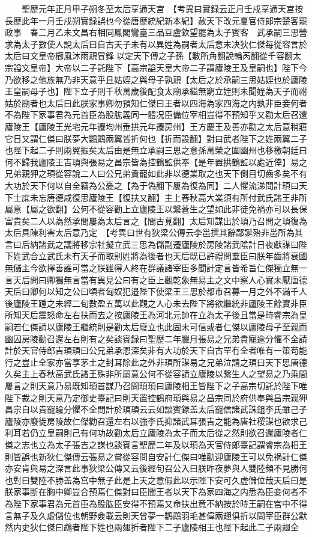 　　聖歷元年正月甲子朔冬至太后享通天宫　【考異曰實録云正月壬戍享通天宫按長歷此年一月壬戍朔實録誤也今從唐歷統紀新本紀】赦天下改元夏官侍郎宗楚客罷政事　春二月乙未文昌右相同鳳閣鸞臺三品豆盧欽望罷為太子賓客　武承嗣三思營求為太子數使人說太后曰自古天子未有以異姓為嗣者太后意未决狄仁傑每從容言於太后曰文皇帝櫛風沐雨親冒鋒以定天下傳之子孫【數所角翻說輪芮翻從千容翻太宗謚文皇帝】大帝以二子託陛下【高宗謚天皇大帝二子謂廬陵王及皇嗣也】陛下今乃欲移之他族無乃非天意乎且姑姪之與母子孰親【太后之於承嗣三思姑姪也於廬陵王皇嗣母子也】陛下立子則千秋萬歲後配食太廟承繼無窮立姪則未聞姪為天子而祔姑於廟者也太后曰此朕家事卿勿預知仁傑曰王者以四海為家四海之内孰非臣妾何者不為陛下家事君為元首臣為股肱義同一體况臣備位宰相豈得不預知乎又勸太后召還廬陵王【廬陵王光宅元年遷均州垂拱元年遷房州】王方慶王及善亦勸之太后意稍寤它日又謂仁傑曰朕夢大鸚鵡兩翼皆折何也【折而設翻】對曰武者陛下之姓兩翼二子也陛下起二子則兩翼振矣太后由是無立承嗣三思之意孫萬榮之圍幽州也移檄朝廷曰何不歸我廬陵王吉頊與張易之昌宗皆為控鶴監供奉【是年置拱鶴監以處近倖】易之兄弟親狎之頊從容說二人曰公兄弟貴寵如此非以德業取之也天下側目切齒多矣不有大功於天下何以自全竊為公憂之【為于偽翻下屢為復為同】二人懼流涕問計頊曰天下士庶未忘唐德咸復思廬陵王【復扶又翻】主上春秋高大業須有所付武氏諸王非所屬意【屬之欲翻】公何不從容勸上立廬陵王以繋蒼生之望如此非徒免禍亦可以長保富貴矣二人以為然承間屢為太后言之【間古莧翻】太后知謀出於頊乃召問之頊復為太后具陳利害太后意乃定　【考異曰世有狄梁公傳云李邕撰其辭鄙誕殆非邕所為其言曰后納諸武之議將移宗社擬立武三思為儲副遷廬陵於房陵諸武隂計日夜獻謀曰陛下姓武合立武氏未冇天子而取别姓將為後者也天后既已許禮問羣臣曰朕年齒將衰國無儲主今欲擇善誰可當之朕雖得人終在群議諸宰臣多聞計定言皆希旨仁傑獨立無一言天后問曰卿獨無言當有異見公曰有之臣上觀乾象無易主之文中察人心實未厭唐德天后曰卿何以知之公曰頃者匈奴犯邉陛下使梁王三思於都市召募一月之外不滿千人後廬陵王踵之未經二旬數盈五萬以此觀之人心未去陛下將欲繼統非廬陵王餘實非臣所知天后震怒命左右扶而去之按廬陵王為河北元帥在立為太子後且當是時睿宗為皇嗣若仁傑請以廬陵王繼統則是勸太后廢立也此固未可信或者仁傑以廬陵母子至親而幽囚房陵勸召還左右則有之矣談賓録曰聖歷二年臘月張易之兄弟貴寵逾分懼不全請計於天官侍郎吉頊頊曰公兄弟承恩深矣非有大功於天下自古罕冇全者唯有一策苟能行之豈止全家亦當享茅土之封耳除此之外非頊所謀易之兄弟泣請之頊曰天下思唐德久矣主上春秋高武氏諸王殊非所屬意公何不從容請立廬陵以繋生人之望易之乃乘間屢言之則天意乃易既知頊首謀乃召問頊頊曰廬陵相王皆陛下之子高宗切託於陛下唯陛下裁之則天意乃定御史臺記曰則天置控鶴府頊與易之昌宗同於府供奉與昌宗親狎昌宗自以貴寵踰分懼不全問計於頊頊云云如談賓録盖太后寵信諸武誅鉏李氏雖己子廬陵亦廢徙房陵故仁傑勸召還左右以強李氏抑諸武耳張吉之能為唐社稷謀也欲求己利耳若仍立皇嗣則己有何功故勸太后立廬陵為太子而太后從之然則欲召還廬陵者仁傑之志也立為太子張吉之謀也談賓言聖歷二年及以頊為天官侍郎臺記謂睿宗為相王則皆誤也新狄仁傑傳云張易之嘗從容問自安計仁傑曰唯勸迎廬陵王可以免祸計仁傑亦安肯與易之深言此事狄梁公傳又云後經旬召公入曰朕昨夜夢與人雙陸頻不見勝何也對曰雙陸不勝盖為宫中無子此是上天之意假此以示陛下安可久虚儲位哉天后曰是朕家事斷在胸中卿豈合預焉仁傑對曰臣聞王者以天下為家四海之内悉為臣妾何者不為陛下家事君為元首臣為股肱臣安得不預焉又命扶出竟不納按於時王嗣在宫中不得言無子及久虚儲位也朝野僉載云則天曾夢一鸚鵡羽毛甚偉兩翅俱折以問宰臣群公默然内史狄仁傑曰鵡者陛下姓也兩翅折者陛下二子廬陵相王也陛下起此二子兩翅全